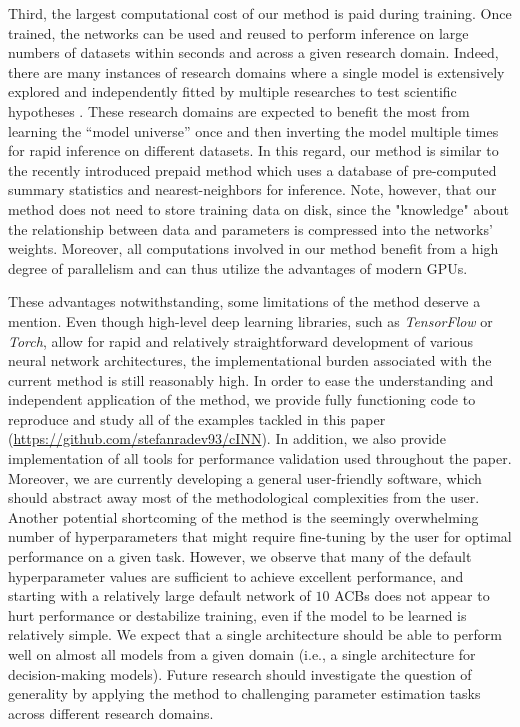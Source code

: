 \documentclass[9pt,twoside,lineno]{pnas-new}
\begin{document}
Third, the largest computational cost of our method is paid during training. Once trained, the networks can be used and reused to perform inference on large numbers of datasets within seconds and across a given research domain. Indeed, there are many instances of research domains where a single model is extensively explored and independently fitted by multiple researches to test scientific hypotheses \cite{voss2019sequential, zappia2017splatter, ratcliff2008diffusion, de2002fitting}. These research domains are expected to benefit the most from learning the “model universe” once and then inverting the model multiple times for rapid inference on different datasets. In this regard, our method is similar to the recently introduced prepaid method \cite{mestdagh2018prepaid} which uses a database of pre-computed summary statistics and nearest-neighbors for inference. Note, however, that our method does not need to store training data on disk, since the "knowledge" about the relationship between data and parameters is compressed into the networks' weights. Moreover, all computations involved in our method benefit from a high degree of parallelism and can thus utilize the advantages of modern GPUs.

These advantages notwithstanding, some limitations of the method deserve a mention. Even though high-level deep learning libraries, such as \textit{TensorFlow} or \textit{Torch}, allow for rapid and relatively straightforward development of various neural network architectures, the implementational burden associated with the current method is still reasonably high. In order to ease the understanding and independent application of the method, we provide fully functioning code to reproduce and study all of the examples tackled in this paper (\href{https://github.com/stefanradev93/cINN}{https://github.com/stefanradev93/cINN}). In addition, we also provide implementation of all tools for performance validation used throughout the paper. Moreover, we are currently developing a general user-friendly software, which should abstract away most of the methodological complexities from the user. Another potential shortcoming of the method is the seemingly overwhelming number of hyperparameters that might require fine-tuning by the user for optimal performance on a given task. However, we observe that many of the default hyperparameter values are sufficient to achieve excellent performance, and starting with a relatively large default network of $10$ ACBs does not appear to hurt performance or destabilize training, even if the model to be learned is relatively simple. We expect that a single architecture should be able to perform well on almost all models from a given domain (i.e., a single architecture for decision-making models). Future research should investigate the question of generality by applying the method to challenging parameter estimation tasks across different research domains.
\end{document}
